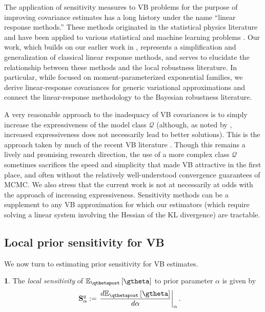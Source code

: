 \documentclass{article}\usepackage[]{graphicx}\usepackage[]{color}
\theoremstyle{plain}
\theoremstyle{definition}
\newtheorem{defn}[thm]{\protect\definitionname}
\theoremstyle{plain}
\theoremstyle{plain}
\theoremstyle{plain}
\theoremstyle{plain}
\providecommand{\definitionname}{Definition}
\begin{document}
The application of sensitivity measures to VB problems for the purpose
of improving covariance estimates has a long history under the name
``linear response methods.'' These methods originated in the statistical
physics literature \citep[e.g.][]{tanaka:2000:information,opper:2001:advancedmeanfield}
and have been applied to various statistical and machine learning
problems \citep{kappen:1998:efficient,tanaka:1998:mean,welling:2004:linear,opper:2003:variational}.
Our work, which builds on our earlier work in \citet{giordano:2015:lrvb},
represents a simplification and generalization of classical linear
response methods, and serves to elucidate the relationship between
these methods and the local robustness literature. In particular,
while \citet{giordano:2015:lrvb} focused on moment-parameterized
exponential families, we derive linear-response covariances for generic
variational approximations and connect the linear-response methodology
to the Bayesian robustness literature.

A very reasonable approach to the inadequacy of VB covariances is
to simply increase the expressiveness of the model class $\mathcal{Q}$
(although, as noted by \citet{turner:2011:two}, increased expressiveness
does not necessarily lead to better solutions). This is the approach
taken by much of the recent VB literature \citep[e.g.][]{ranganath:201:4black,tran:2015:copula,tran:2015:gp,ranganath:2015:hierarchical,liu:2016:stein}.
Though this remains a lively and promising research direction, the
use of a more complex class $\mathcal{Q}$ sometimes sacrifices the
speed and simplicity that made VB attractive in the first place, and
often without the relatively well-understood convergence guarantees
of MCMC. We also stress that the current work is not at necessarily
at odds with the approach of increasing expressiveness. Sensitivity
methods can be a supplement to any VB approximation for which our
estimators (which require solving a linear system involving the Hessian
of the KL divergence) are tractable.

\subsection{Local prior sensitivity for VB \label{subsec:lrvb_robustness} }

We now turn to estimating prior sensitivity for VB estimates. 
\begin{defn}
The \textit{local sensitivity} of $\eqgtheta$ to prior parameter
$\alpha$ is given by
\begin{align*}
\qsens & :=\left.\frac{d\eqgtheta}{d\alpha}\right|_{\alpha}.
\end{align*}
%
\end{defn}
\end{document}
